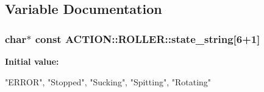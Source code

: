\subsection{\-Variable \-Documentation}
\hypertarget{namespace_a_c_t_i_o_n_1_1_r_o_l_l_e_r_a3cb1b43d9981db41f686a860e000a2c7}{
\subsubsection[{state\-\_\-string}]{\setlength{\rightskip}{0pt plus 5cm}char$\ast$ const {\bf \-A\-C\-T\-I\-O\-N\-::\-R\-O\-L\-L\-E\-R\-::state\-\_\-string}\mbox{[}6+1\mbox{]}}}
\label{namespace_a_c_t_i_o_n_1_1_r_o_l_l_e_r_a3cb1b43d9981db41f686a860e000a2c7}
{\bfseries \-Initial value\-:}
\begin{DoxyCode}

        {"ERROR", "Stopped", "Sucking", "Spitting", "Rotating"}
\end{DoxyCode}
